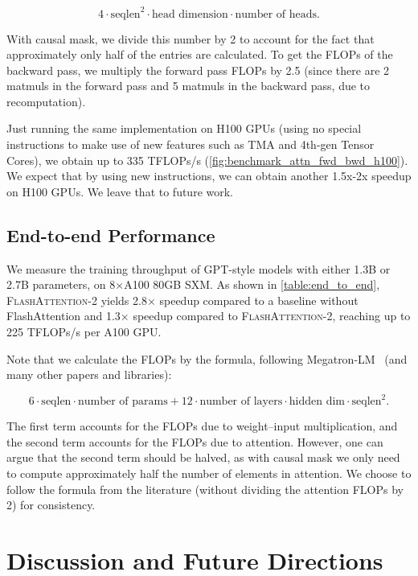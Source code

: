 \begin{equation*}
  4 \cdot \text{seqlen}^2 \cdot \text{head dimension} \cdot \text{number of heads}.
\end{equation*}

With causal mask, we divide this number by 2 to account for the fact that approximately only half of the entries are calculated. To get the FLOPs of the backward pass, we multiply the forward pass FLOPs by 2.5 (since there are 2 matmuls in the forward pass and 5 matmuls in the backward pass, due to recomputation).

Just running the same implementation on H100 GPUs (using no special instructions to make use of new features such as TMA and 4th-gen Tensor Cores), we obtain up to 335 TFLOPs/s (\ref{fig:benchmark_attn_fwd_bwd_h100}).
We expect that by using new instructions, we can obtain another 1.5x-2x speedup on H100 GPUs. We leave that to future work.

\subsection{End-to-end Performance}
\label{subsec:end_to_end}

We measure the training throughput of GPT-style models with either 1.3B or 2.7B parameters, on 8$\times$A100 80GB SXM. As shown in \ref{table:end_to_end}, \textsc{FlashAttention-2} yields 2.8$\times$ speedup compared to a baseline without FlashAttention and 1.3$\times$ speedup compared to \textsc{FlashAttention-2}, reaching up to 225 TFLOPs/s per A100 GPU.

Note that we calculate the FLOPs by the formula, following Megatron-LM~\citep{shoeybi2019megatron} (and many other papers and libraries):

\begin{equation*}
  6 \cdot \text{seqlen} \cdot \text{number of params} + 12 \cdot \text{number of layers} \cdot \text{hidden dim} \cdot \text{seqlen}^2.
\end{equation*}

The first term accounts for the FLOPs due to weight--input multiplication, and the second term accounts for the FLOPs due to attention. However, one can argue that the second term should be halved, as with causal mask we only need to compute approximately half the number of elements in attention. We choose to follow the formula from the literature (without dividing the attention FLOPs by 2) for consistency.

\section{Discussion and Future Directions}
\label{sec:discussion}

